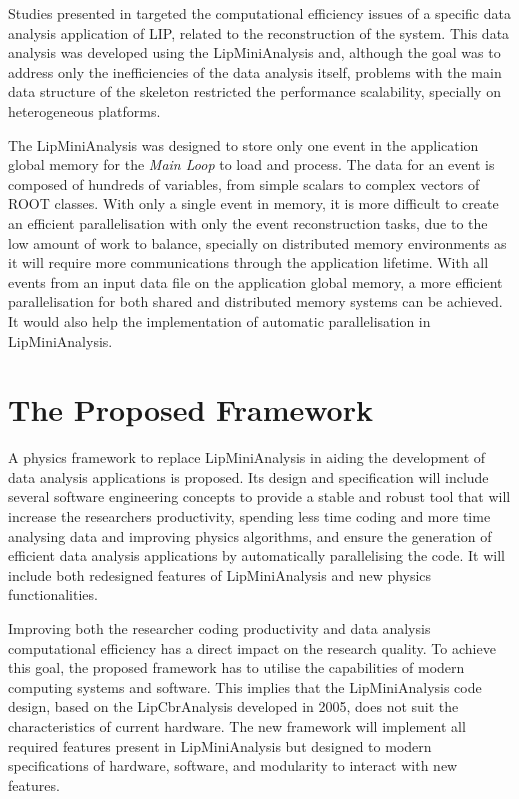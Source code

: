 Studies presented in \cite{Msc:AMP,paperAMP} targeted the computational efficiency issues of a specific data analysis application of LIP, related to the reconstruction of the \ttH system. This data analysis was developed using the LipMiniAnalysis and, although the goal was to address only the inefficiencies of the data analysis itself, problems with the main data structure of the skeleton restricted the performance scalability, specially on heterogeneous platforms.

The LipMiniAnalysis was designed to store only one event in the application global memory for the \textit{Main Loop} to load and process. The data for an event is composed of hundreds of variables, from simple scalars to complex vectors of ROOT classes. With only a single event in memory, it is more difficult to create an efficient parallelisation with only the event reconstruction tasks, due to the low amount of work to balance, specially on distributed memory environments as it will require more communications through the application lifetime. With all events from an input data file on the application global memory, a more efficient parallelisation for both shared and distributed memory systems can be achieved. It would also help the implementation of automatic parallelisation in LipMiniAnalysis.

\section{The Proposed Framework}
\label{new_framework}

A physics framework to replace LipMiniAnalysis in aiding the development of data analysis applications is proposed. Its design and specification will include several software engineering concepts to provide a stable and robust tool that will increase the researchers productivity, spending less time coding and more time analysing data and improving physics algorithms, and ensure the generation of efficient data analysis applications by automatically parallelising the code. It will include both redesigned features of LipMiniAnalysis and new physics functionalities.

Improving both the researcher coding productivity and data analysis computational efficiency has a direct impact on the research quality. To achieve this goal, the proposed framework has to utilise the capabilities of modern computing systems and software. This implies that the LipMiniAnalysis code design, based on the LipCbrAnalysis developed in 2005, does not suit the characteristics of current hardware. The new framework will implement all required features present in LipMiniAnalysis but designed to modern specifications of hardware, software, and modularity to interact with new features.

